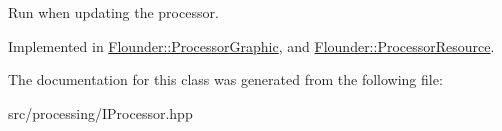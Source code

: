 Run when updating the processor. 



Implemented in \hyperlink{class_flounder_1_1_processor_graphic_a54cb1365a43270193275ce3794b03b2e}{Flounder\+::\+Processor\+Graphic}, and \hyperlink{class_flounder_1_1_processor_resource_a1167c01d0a317a054211972ea32e09cd}{Flounder\+::\+Processor\+Resource}.



The documentation for this class was generated from the following file\+:\begin{DoxyCompactItemize}
\item 
src/processing/I\+Processor.\+hpp\end{DoxyCompactItemize}
